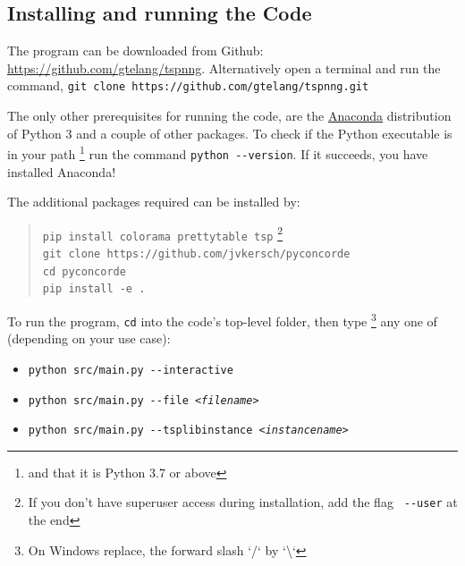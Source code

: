 \newpage

\begin{appendices}
\renewcommand{\thesection}{\Alph{section}}

\section{Installing and running the Code}
\label{sec:install}

The program can be downloaded from Github: \url{https://github.com/gtelang/tspnng}. Alternatively
open a terminal and run the command, \texttt{git clone https://github.com/gtelang/tspnng.git}

The only other prerequisites for running the code, are the 
\href{https://www.anaconda.com/products/individual}{Anaconda} distribution of Python 3 
and a couple of other packages.  To check if the Python executable is in your path \footnote{and that it is Python 3.7 or above}
run the command \verb|python --version|. If it succeeds, you have installed Anaconda! 

The additional packages required can be installed by: 

\begin{quote}
\color{blue}
\texttt{pip install colorama prettytable tsp} \footnote{If you don't have superuser access during installation, add the flag \texttt{\color{red} \texttt{-{}-}user} at the end}   \\
\texttt{git clone https://github.com/jvkersch/pyconcorde} \\
\texttt{cd pyconcorde}\\
\texttt{pip install -e .}
\end{quote}


To run the program, \texttt{cd} into the code's top-level folder, then type \footnote{On Windows replace, the forward slash `/` by `\textbackslash`}
any one of (depending on your use case): 


{\LARGE \color{alizarin}
\begin{itemize}
\item \texttt{python src/main.py \textit{-}\textit{-}interactive}
\item \texttt{python src/main.py \textit{-}\textit{-}file \textit{<filename>}} 
\item \texttt{python src/main.py \textit{-}\textit{-}tsplibinstance \textit{<instancename>}}
\end{itemize}
}


\end{appendices}
